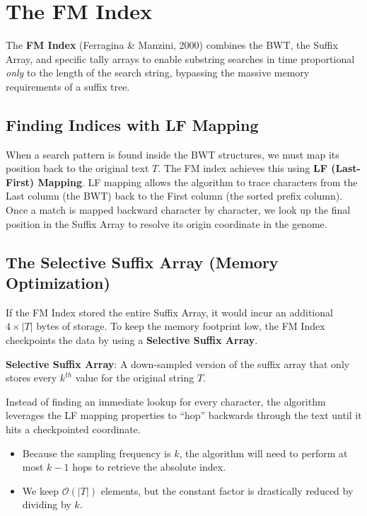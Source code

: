 \section{The FM Index}

The \textbf{FM Index} (Ferragina \& Manzini, 2000) combines the BWT, the Suffix Array, and specific tally arrays to enable substring searches in time proportional \textit{only} to the length of the search string, bypassing the massive memory requirements of a suffix tree. 

\subsection{Finding Indices with LF Mapping}
When a search pattern is found inside the BWT structures, we must map its position back to the original text \( T \). The FM index achieves this using \textbf{LF (Last-First) Mapping}. LF mapping allows the algorithm to trace characters from the Last column (the BWT) back to the First column (the sorted prefix column). 
Once a match is mapped backward character by character, we look up the final position in the Suffix Array to resolve its origin coordinate in the genome.

\subsection{The Selective Suffix Array (Memory Optimization)}
If the FM Index stored the entire Suffix Array, it would incur an additional \( 4 \times |T| \) bytes of storage. To keep the memory footprint low, the FM Index checkpoints the data by using a \textbf{Selective Suffix Array}.

\begin{important}
  \textbf{Selective Suffix Array}: A down-sampled version of the suffix array that only stores every \( k^{th} \) value for the original string \( T \).
\end{important}

Instead of finding an immediate lookup for every character, the algorithm leverages the LF mapping properties to ``hop'' backwards through the text until it hits a checkpointed coordinate.
\begin{itemize}
    \item Because the sampling frequency is \( k \), the algorithm will need to perform at most \( k - 1 \) hops to retrieve the absolute index.
    \item We keep \( \mathcal{O}(|T|) \) elements, but the constant factor is drastically reduced by dividing by \( k \).
\end{itemize}

